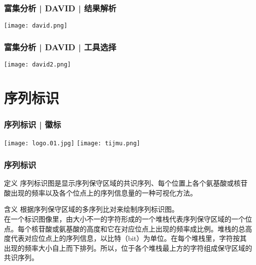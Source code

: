 \begin{frame}
  \frametitle{富集分析 | DAVID | \alert{结果解析}}
  \begin{center}
    \texttt{[image: david.png]}
  \end{center}
\end{frame}

\begin{frame}
  \frametitle{富集分析 | DAVID | 工具选择}
  \begin{center}
    \texttt{[image: david2.png]}
  \end{center}
\end{frame}

\section{序列标识}
\begin{frame}
  \frametitle{序列标识 | 徽标}
  \begin{center}
    \texttt{[image: logo.01.jpg]}
    \qquad
    \texttt{[image: tijmu.png]}
  \end{center}
\end{frame}

\begin{frame}
  \frametitle{\alert{序列标识}}
  \begin{block}{定义}
序列标识图是显示序列保守区域的共识序列、每个位置上各个氨基酸或核苷酸出现的频率以及各个位点上的序列信息量的一种可视化方法。
  \end{block}
  \pause
  \begin{block}{含义}
    根据序列保守区域的多序列比对来绘制序列标识图。\\
    \vspace{0.5em}
在一个标识图像里，由大小不一的字符形成的一个堆栈代表序列保守区域的一个位点。每个核苷酸或氨基酸的高度和它在对应位点上出现的频率成比例。堆栈的总高度代表对应位点上的序列信息，以比特（bit）为单位。在每个堆栈里，字符按其出现的频率大小自上而下排列。所以，位于各个堆栈最上方的字符组成保守区域的共识序列。
  \end{block}
\end{frame}

